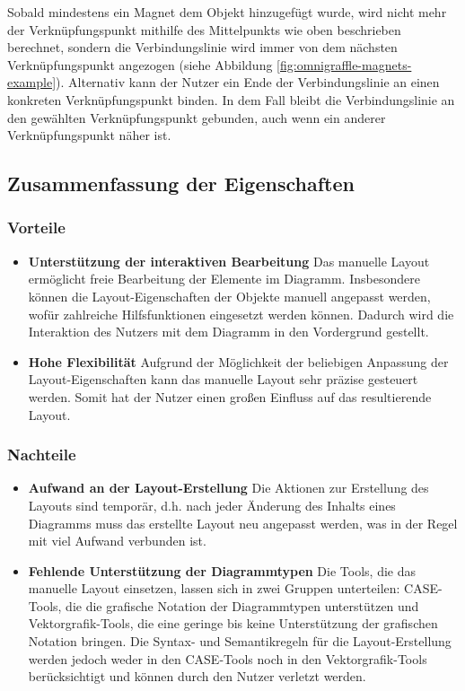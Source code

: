 Sobald mindestens ein Magnet dem Objekt hinzugefügt wurde, wird nicht mehr der Verknüpfungspunkt mithilfe des Mittelpunkts wie oben beschrieben berechnet, sondern die Verbindungslinie wird immer von dem nächsten Verknüpfungspunkt angezogen (siehe Abbildung \ref{fig:omnigraffle-magnets-example}). Alternativ kann der Nutzer ein Ende der Verbindungslinie an einen konkreten Verknüpfungspunkt binden. In dem Fall bleibt die Verbindungslinie an den gewählten Verknüpfungspunkt gebunden, auch wenn ein anderer Verknüpfungspunkt näher ist.

\subsection{Zusammenfassung der Eigenschaften}
\label{subsec:summary-manual-layout}

\subsubsection{Vorteile}

\begin{itemize}

\item
\textbf{Unterstützung der interaktiven Bearbeitung}
Das manuelle Layout ermöglicht freie Bearbeitung der Elemente im Diagramm. Insbesondere können die Layout-Eigenschaften der Objekte manuell angepasst werden, wofür zahlreiche Hilfsfunktionen eingesetzt werden können. Dadurch wird die Interaktion des Nutzers mit dem Diagramm in den Vordergrund gestellt.

\item
\textbf{Hohe Flexibilität}
Aufgrund der Möglichkeit der beliebigen Anpassung der Layout-Ei\-gen\-schaften kann das manuelle Layout sehr präzise gesteuert werden. Somit hat der Nutzer einen großen Einfluss auf das resultierende Layout.

\end{itemize}

\subsubsection{Nachteile}

\begin{itemize}

\item
\textbf{Aufwand an der Layout-Erstellung}
Die Aktionen zur Erstellung des Layouts sind temporär, d.h. nach jeder Änderung des Inhalts eines Diagramms muss das erstellte Layout neu angepasst werden, was in der Regel mit viel Aufwand verbunden ist.

\item
\textbf{Fehlende Unterstützung der Diagrammtypen}
Die Tools, die das manuelle Layout einsetzen, lassen sich in zwei Gruppen unterteilen: CASE-Tools, die die grafische Notation der Diagrammtypen unterstützen und Vektorgrafik-Tools, die eine geringe bis keine Unterstützung der grafischen Notation bringen. Die Syntax- und Semantikregeln für die Layout-Erstellung werden jedoch weder in den CASE-Tools noch in den Vektorgrafik-Tools berücksichtigt und können durch den Nutzer verletzt werden.

\end{itemize}

